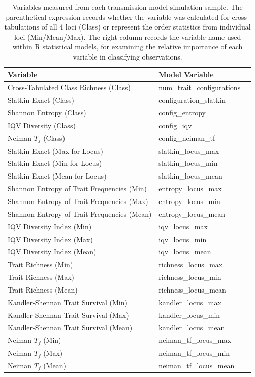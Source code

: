 \documentclass[10pt,letterpaper]{article}
\begin{document}
\begin{table}[ht]
\begin{tabular}{lll}
\hline
Variable                                    & Model Variable \\ 
\hline
Cross-Tabulated Class Richness  (Class)         &  num\_trait\_configurations      \\
Slatkin Exact (Class)           & configuration\_slatkin       \\
Shannon Entropy (Class)  &  config\_entropy \\
IQV Diversity (Class)  & config\_iqv \\
Neiman $T_f$ (Class) & config\_neiman\_tf \\
Slatkin Exact (Max for Locus)                    & slatkin\_locus\_max       \\
Slatkin Exact (Min for Locus)                     & slatkin\_locus\_min      \\
Slatkin Exact (Mean for Locus)                   & slatkin\_locus\_mean       \\
Shannon Entropy of Trait Frequencies (Min)      & entropy\_locus\_max       \\
Shannon Entropy of Trait Frequencies (Max)       & entropy\_locus\_min      \\
Shannon Entropy of Trait Frequencies (Mean)      & entropy\_locus\_mean      \\
IQV Diversity Index (Min)     & iqv\_locus\_max \\
IQV Diversity Index (Max)     & iqv\_locus\_min \\
IQV Diversity Index (Mean)    & iqv\_locus\_mean \\
Trait Richness (Min)   & richness\_locus\_max \\ 
Trait Richness (Max)   & richness\_locus\_min \\
Trait Richness (Mean)    & richness\_locus\_mean \\
Kandler-Shennan Trait Survival (Min)   & kandler\_locus\_max \\
Kandler-Shennan Trait Survival (Max)   & kandler\_locus\_min \\
Kandler-Shennan Trait Survival (Mean)   & kandler\_locus\_mean \\
Neiman $T_f$ (Min)   & neiman\_tf\_locus\_max \\
Neiman $T_f$ (Max)   & neiman\_tf\_locus\_min \\
Neiman $T_f$ (Mean)   & neiman\_tf\_locus\_mean \\
\hline

\end{tabular}

\caption{Variables measured from each transmission model simulation sample.  The parenthetical expression records whether the variable was calculated for cross-tabulations of all 4 loci (Class) or represent the order statistics from individual loci (Min/Mean/Max).  The right column records the variable name used within R statistical models, for examining the relative importance of each variable in classifying observations.}
\label{tab:variables}
\end{table}
\end{document}
